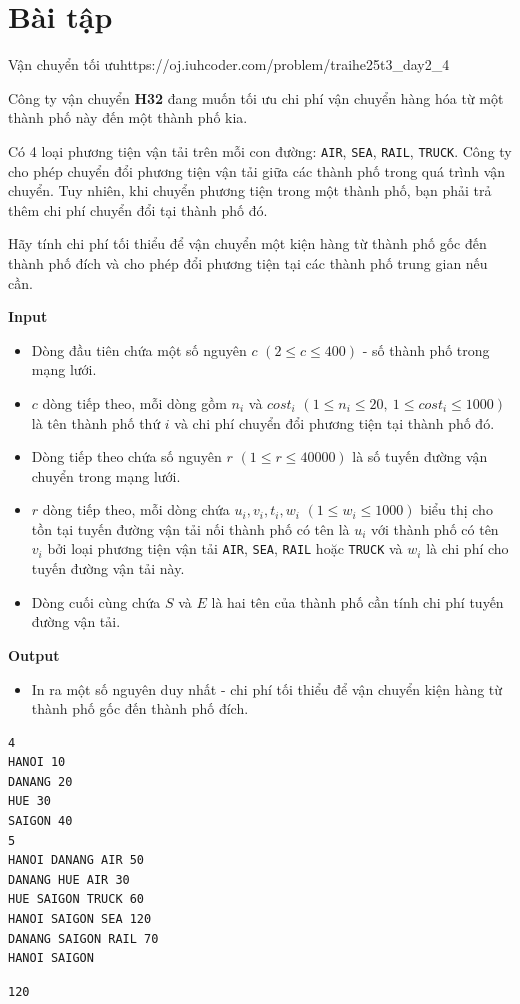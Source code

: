 \section{Bài tập}

\begin{baitap}{Vận chuyển tối ưu}{https://oj.iuhcoder.com/problem/traihe25t3\_day2\_4}

Công ty vận chuyển \textbf{H32} đang muốn tối ưu chi phí vận chuyển hàng hóa từ một thành phố này đến một thành phố kia.

Có 4 loại phương tiện vận tải trên mỗi con đường: \texttt{AIR}, \texttt{SEA}, \texttt{RAIL}, \texttt{TRUCK}. Công ty cho phép chuyển đổi phương tiện vận tải giữa các thành phố trong quá trình vận chuyển. Tuy nhiên, khi chuyển phương tiện trong một thành phố, bạn phải trả thêm chi phí chuyển đổi tại thành phố đó.

Hãy tính chi phí tối thiểu để vận chuyển một kiện hàng từ thành phố gốc đến thành phố đích và cho phép đổi phương tiện tại các thành phố trung gian nếu cần.

\textbf{Input}

\begin{itemize}
    \item Dòng đầu tiên chứa một số nguyên $c$ $(2 \leq c \leq 400)$ - số thành phố trong mạng lưới.
    \item $c$ dòng tiếp theo, mỗi dòng gồm $n_i$ và $cost_i$ $(1 \leq n_i \leq 20,\ 1 \leq cost_i \leq 1000)$ là tên thành phố thứ $i$ và chi phí chuyển đổi phương tiện tại thành phố đó.
    \item Dòng tiếp theo chứa số nguyên $r$ $(1 \leq r \leq 40000)$ là số tuyến đường vận chuyển trong mạng lưới.
    \item $r$ dòng tiếp theo, mỗi dòng chứa $u_i, v_i, t_i, w_i$ $(1 \leq w_i \leq 1000)$ biểu thị cho tồn tại tuyến đường vận tải nối thành phố có tên là $u_i$ với thành phố có tên $v_i$ bởi loại phương tiện vận tải \texttt{AIR}, \texttt{SEA}, \texttt{RAIL} hoặc \texttt{TRUCK} và $w_i$ là chi phí cho tuyến đường vận tải này.
    \item Dòng cuối cùng chứa $S$ và $E$ là hai tên của thành phố cần tính chi phí tuyến đường vận tải.
\end{itemize}

\textbf{Output}
\begin{itemize}
    \item In ra một số nguyên duy nhất - chi phí tối thiểu để vận chuyển kiện hàng từ thành phố gốc đến thành phố đích.
\end{itemize}

\begin{lstlisting}[caption={Sample Input}]
4
HANOI 10
DANANG 20
HUE 30
SAIGON 40
5
HANOI DANANG AIR 50
DANANG HUE AIR 30
HUE SAIGON TRUCK 60
HANOI SAIGON SEA 120
DANANG SAIGON RAIL 70
HANOI SAIGON
\end{lstlisting}
\begin{lstlisting}[caption={Sample Output}]
120
\end{lstlisting}

\end{baitap}

